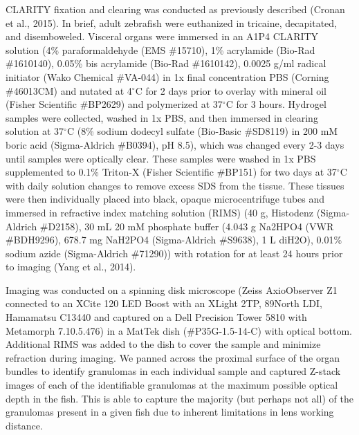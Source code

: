 \citep{Yang2014d}
\citep{Cronan2015}
\citep{Chung2013}

CLARITY fixation and clearing was conducted as previously described (Cronan et al., 2015). In brief, adult zebrafish were euthanized in tricaine, decapitated, and disemboweled. Visceral organs were immersed in an A1P4 CLARITY solution (4\% paraformaldehyde (EMS \#15710), 1\% acrylamide (Bio-Rad \#1610140), 0.05\% bis acrylamide (Bio-Rad \#1610142), 0.0025 g/ml radical initiator (Wako Chemical \#VA-044) in 1x final concentration PBS (Corning \#46013CM) and nutated at 4$^{\circ}$C for 2 days prior to overlay with mineral oil (Fisher Scientific \#BP2629) and polymerized at 37$^{\circ}$C for 3 hours. Hydrogel samples were collected, washed in 1x PBS, and then immersed in clearing solution at 37$^{\circ}$C (8\% sodium dodecyl sulfate (Bio-Basic \#SD8119) in 200 mM boric acid (Sigma-Aldrich \#B0394), pH 8.5), which was changed every 2-3 days until samples were optically clear. These samples were washed in 1x PBS supplemented to 0.1\% Triton-X (Fisher Scientific \#BP151) for two days at 37$^{\circ}$C with daily solution changes to remove excess SDS from the tissue. These tissues were then individually placed into black, opaque microcentrifuge tubes and immersed in refractive index matching solution (RIMS) (40 g, Histodenz (Sigma-Aldrich \#D2158), 30 mL 20 mM phosphate buffer (4.043 g Na2HPO4 (VWR \#BDH9296), 678.7 mg NaH2PO4 (Sigma-Aldrich \#S9638), 1 L diH2O), 0.01\% sodium azide (Sigma-Aldrich \#71290)) with rotation for at least 24 hours prior to imaging (Yang et al., 2014). 

Imaging was conducted on a spinning disk microscope (Zeiss AxioObserver Z1 connected to an XCite 120 LED Boost with an XLight 2TP, 89North LDI, Hamamatsu C13440 and captured on a Dell Precision Tower 5810 with Metamorph 7.10.5.476) in a MatTek dish (\#P35G-1.5-14-C) with optical bottom. Additional RIMS was added to the dish to cover the sample and minimize refraction during imaging. We panned across the proximal surface of the organ bundles to identify granulomas in each individual sample and captured Z-stack images of each of the identifiable granulomas at the maximum possible optical depth in the fish. This is able to capture the majority (but perhaps not all) of the granulomas present in a given fish due to inherent limitations in lens working distance.

